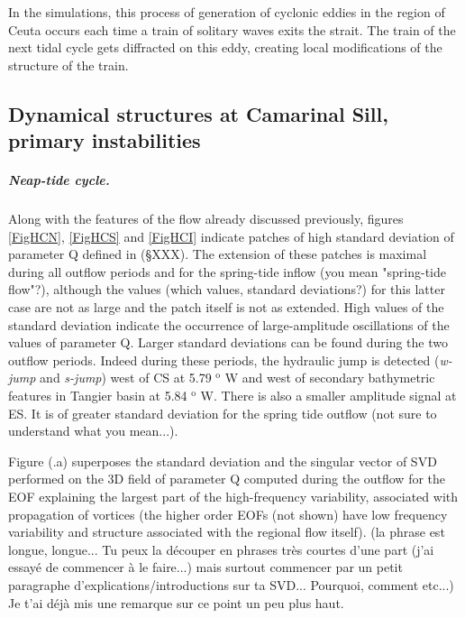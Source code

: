 In the simulations, this process of generation of cyclonic eddies \color{blue} in the region of Ceuta \color{black} occurs each time a train of solitary waves exits the strait. The train of the next tidal cycle gets diffracted on this eddy, creating local \color{blue}modifications of the structure of the train. \color{black}

\subsection{Dynamical structures at Camarinal Sill, primary instabilities}

\subparagraph{Neap-tide cycle.}
Along with the features of the flow already discussed previously, figures \ref{FigHCN}, \ref{FigHCS} and \ref{FigHCI} indicate patches of high standard deviation of parameter Q \color{blue} defined in (\S XXX). The extension of these patches is maximal during all outflow periods \color{black} and for the spring-tide inflow \color{green} (you mean "spring-tide flow"?), \color{black} although the values \color{green}(which values, standard deviations?) \color{black} for this latter case are not as large and the patch itself is not as extended. High values of the \color{blue} standard deviation \color{black} indicate the occurrence of large-amplitude oscillations of the values of parameter Q. \color{blue} Larger standard deviations can be found during the two outflow periods. Indeed during these periods, the hydraulic jump \color{black} is detected (\textit{w-jump} and \textit{s-jump}) west of CS at 5.79 $^\text{o}$ W and west of secondary bathymetric features in Tangier basin at 5.84 $^\text{o}$ W. There is also \color{blue} a smaller amplitude \color{black} signal at ES. It is of greater standard deviation for the spring tide outflow \color{green} (not sure to understand what you mean...). \color{black}

\color{blue}Figure (.a) superposes the standard deviation and \color{black} the singular vector of SVD performed on the 3D field of parameter Q computed during the outflow for the EOF explaining the largest part of the high-frequency variability, associated with propagation of vortices (the higher order EOFs (not shown) have low frequency variability and structure associated with the regional flow itself). \color{green}(la phrase est longue, longue... Tu peux la découper en phrases très courtes d'une part (j'ai essayé de commencer à le faire...) mais surtout commencer par un petit paragraphe d'explications/introductions sur ta SVD... Pourquoi, comment etc...) Je t'ai déjà mis une remarque sur ce point un peu plus haut. \color{black}

